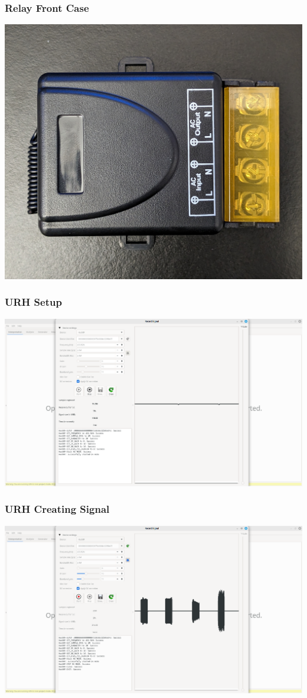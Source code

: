 \documentclass{beamer}
\begin{document}
\begin{frame}
\frametitle{Relay Front Case}
\includegraphics[width=\textwidth]{../Pics/device/relay_front_case.jpg}
\end{frame}

\begin{frame}
\frametitle{URH Setup}
\includegraphics[width=\textwidth]{../Pics/screenshots/URH-setup.png}
\end{frame}

\begin{frame}
\frametitle{URH Creating Signal}
\includegraphics[width=\textwidth]{../Pics/screenshots/URH_Creating_Signal.png}
\end{frame}
\end{document}
